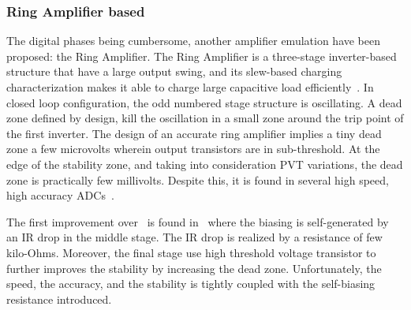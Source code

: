 		\subsubsection{Ring Amplifier based}
The digital phases being cumbersome, another amplifier emulation have been proposed: the Ring Amplifier. The Ring Amplifier is a three-stage inverter-based structure that have a large output swing, and its slew-based charging characterization makes it able to charge large capacitive load efficiently~\cite{Hershberg2012}.
In closed loop configuration, the odd numbered stage structure is oscillating. A dead zone defined by design, kill the oscillation in a small zone around the trip point of the first inverter.
The design of an accurate ring amplifier implies a tiny dead zone a few microvolts wherein output transistors are in sub-threshold. At the edge of the stability zone, and taking into consideration PVT variations, the dead zone is practically few millivolts. Despite this, it is found in several high speed, high accuracy ADCs~\cite{Hershberg2012,YLim2015,YLim2015FD,YCao2017}.

The first improvement over~\cite{Hershberg2012} is found in~\cite{YLim2015} where the biasing is self-generated by an IR drop in the middle stage. The IR drop is realized by a resistance of few kilo-Ohms. Moreover, the final stage use high threshold voltage transistor to further improves the stability by increasing the dead zone. Unfortunately, the speed, the accuracy, and the stability is tightly coupled with the self-biasing resistance introduced.

